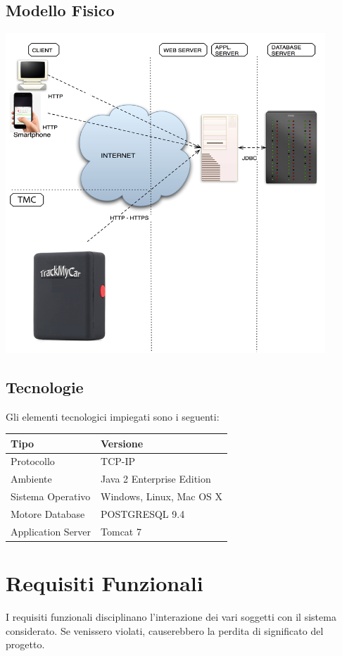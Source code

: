 \documentclass[a4paper,12pt]{article}
\begin{document}
\subsection{Modello Fisico}
\includegraphics[width=12cm, height=12cm]{../IMG/ModFisico.png}


\subsection{Tecnologie}
\begin{table}[h]
Gli elementi tecnologici impiegati sono i seguenti:
\begin{center}
\begin{tabular}{ p{}  p{} }
\rowcolor{Ash}
\hline	
Tipo & Versione \\ \hline
Protocollo & TCP-IP \\ 
Ambiente & Java 2 Enterprise Edition \\ 
Sistema Operativo & Windows, Linux, Mac OS X \\ 
Motore Database & POSTGRESQL 9.4 \\ 
Application Server & Tomcat 7 \\ \hline
\end{tabular}
\end{center}
\end{table}

\pagebreak

\section{Requisiti Funzionali}
I requisiti funzionali disciplinano l'interazione dei vari soggetti con il sistema considerato. Se venissero violati, causerebbero la perdita di significato del progetto.
\end{document}
